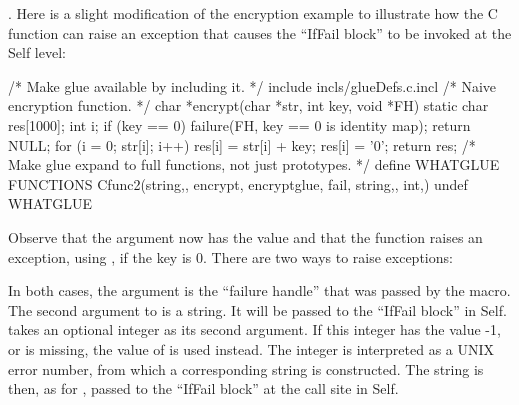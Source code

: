\documentclass[letterpaper,10pt,english]{sphinxmanual}
\begin{document}
. Here is a slight modification of the encryption example to illustrate how the C function can raise an exception that causes the “IfFail block” to be invoked at the Self level:

\begin{sphinxVerbatim}[commandchars=\\\{\}]
/* Make glue available by including it. */
\PYGZsh{} include \PYGZdq{}incls/\PYGZus{}glueDefs.c.incl\PYGZdq{}
/* Naive encryption function. */
char *encrypt(char *str, int key, void *FH) \PYGZob{}
    static char res[1000];
    int i;
    if (key == 0) \PYGZob{}
            failure(FH, \PYGZdq{}key == 0 is identity map\PYGZdq{});
            return NULL;
    \PYGZcb{}
    for (i = 0; str[i]; i++)
            res[i] = str[i] + key;
    res[i] = ’\PYGZbs{}0’;
    return res;
\PYGZcb{}
/* Make glue expand to full functions, not just prototypes. */
\PYGZsh{} define WHAT\PYGZus{}GLUE FUNCTIONS
    C\PYGZus{}func\PYGZus{}2(string,, encrypt, encrypt\PYGZus{}glue, fail, string,, int,)
\PYGZsh{} undef WHAT\PYGZus{}GLUE
\end{sphinxVerbatim}

Observe that the  argument now has the value  and that the  function
raises an exception, using , if the key is 0. There are two ways to raise exceptions:

\begin{sphinxVerbatim}[commandchars=\\\{\}]
      
        
\end{sphinxVerbatim}

In both cases, the  argument is the “failure handle” that was passed by the  macro.
The second argument to  is a string. It will be passed to the “IfFail block” in Self.
 takes an optional integer as its second argument. If this integer has the value -1,
or is missing, the value of  is used instead. The integer is interpreted as a UNIX error number,
from which a corresponding string is constructed. The string is then, as for , passed
to the “IfFail block” at the call site in Self.
\end{document}
